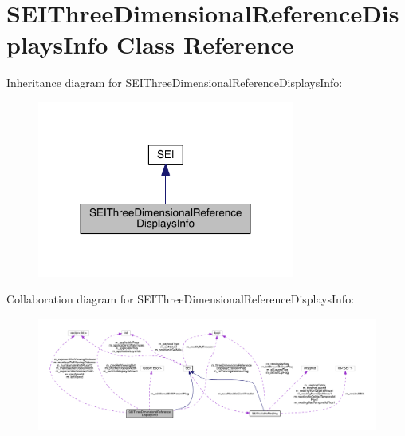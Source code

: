 \hypertarget{class_s_e_i_three_dimensional_reference_displays_info}{}\section{S\+E\+I\+Three\+Dimensional\+Reference\+Displays\+Info Class Reference}
\label{class_s_e_i_three_dimensional_reference_displays_info}


Inheritance diagram for S\+E\+I\+Three\+Dimensional\+Reference\+Displays\+Info\+:
\nopagebreak
\begin{figure}[H]
\begin{center}
\leavevmode
\includegraphics[width=239pt]{d7/d9d/class_s_e_i_three_dimensional_reference_displays_info__inherit__graph}
\end{center}
\end{figure}


Collaboration diagram for S\+E\+I\+Three\+Dimensional\+Reference\+Displays\+Info\+:
\nopagebreak
\begin{figure}[H]
\begin{center}
\leavevmode
\includegraphics[width=350pt]{db/d01/class_s_e_i_three_dimensional_reference_displays_info__coll__graph}
\end{center}
\end{figure}
